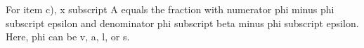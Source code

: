 For item c), x subscript A equals the fraction with numerator phi minus phi subscript epsilon and denominator phi subscript beta minus phi subscript epsilon. Here, phi can be v, a, l, or s.